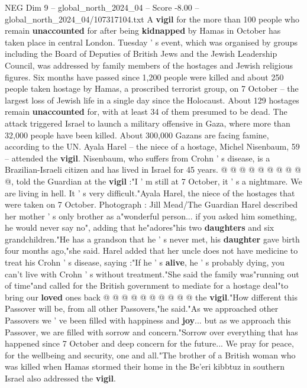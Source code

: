 \begin{textsample}{NEG Dim 9 – global\_north\_2024\_04 – Score -8.00 – global\_north\_2024\_04/107317104.txt}  \label{ex:f9_neg_262}
A \textbf{vigil} for the more than 100 people who remain \textbf{unaccounted} for after being \textbf{kidnapped} by Hamas in October has taken place in central London.
Tuesday ' s event, which was organised by groups including the Board of Deputies of British Jews and the Jewish Leadership Council, was addressed by family members of the hostages and Jewish religious figures.
Six months have passed since 1,200 people were killed and about 250 people taken hostage by Hamas, a proscribed terrorist group, on 7 October -- the largest loss of Jewish life in a single day since the Holocaust.
About 129 hostages remain \textbf{unaccounted} for, with at least 34 of them presumed to be dead.
The attack triggered Israel to launch a military offensive in Gaza, where more than 32,000 people have been killed.
About 300,000 Gazans are facing famine, according to the UN.
Ayala Harel -- the niece of a hostage, Michel Nisenbaum, 59 -- attended the \textbf{vigil}.
Nisenbaum, who suffers from Crohn ' s disease, is a Brazilian-Israeli citizen and has lived in Israel for 45 years. @ @ @ @ @ @ @ @ @ @, told the Guardian at the \textbf{vigil} :"I ' m still at 7 October, it ' s a nightmare.
We are living in hell.
It ' s very difficult."Ayala Harel, the niece of the hostages that were taken on 7 October.
Photograph : Jill Mead/The Guardian Harel described her mother ' s only brother as a"wonderful person... if you asked him something, he would never say no", adding that he"adores"his two \textbf{daughters} and six grandchildren."He has a grandson that he ' s never met, his \textbf{daughter} gave birth four months ago,"she said.
Harel added that her uncle does not have medicine to treat his Crohn ' s disease, saying :"If he ' s \textbf{alive}, he ' s probably dying, you can't live with Crohn ' s without treatment."She said the family was"running out of time"and called for the British government to mediate for a hostage deal"to bring our \textbf{loved} ones back @ @ @ @ @ @ @ @ @ @ the \textbf{vigil}."How different this Passover will be, from all other Passovers,"he said."As we approached other Passovers we ' ve been filled with happiness and \textbf{joy}... but as we approach this Passover, we are filled with sorrow and concern."Sorrow over everything that has happened since 7 October and deep concern for the future...
We pray for peace, for the wellbeing and security, one and all."The brother of a British woman who was killed when Hamas stormed their home in the Be'eri kibbtuz in southern Israel also addressed the \textbf{vigil}.

\end{textsample}
